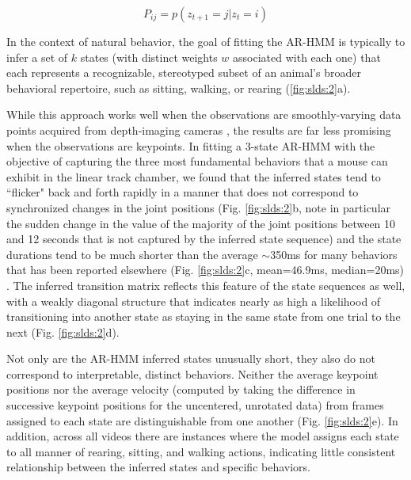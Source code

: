 \begin{equation}
\label{eq:slds_2}
    P_{ij} = p\left( {z_{t + 1} = j|z_t = i} \right)
\end{equation}

In the context of natural behavior, the goal of fitting the AR-HMM is typically to infer a set of $k$ states (with distinct weights $w$ associated with each one) that each represents a recognizable, stereotyped subset of an animal's broader behavioral repertoire, such as sitting, walking, or rearing (\ref{fig:slds:2}a).

While this approach works well when the observations are smoothly-varying data points acquired from depth-imaging cameras \cite{wiltschko_mapping_2015, markowitz_striatum_2018, wiltschko_revealing_2020}, the results are far less promising when the observations are keypoints. In fitting a 3-state AR-HMM with the objective of capturing the three most fundamental behaviors that a mouse can exhibit in the linear track chamber, we found that the inferred states tend to ``flicker" back and forth rapidly in a manner that does not correspond to synchronized changes in the joint positions (Fig. \ref{fig:slds:2}b, note in particular the sudden change in the value of the majority of the joint positions between 10 and 12 seconds that is not captured by the inferred state sequence) and the state durations tend to be much shorter than the average $\sim$350ms for many behaviors that has been reported elsewhere (Fig. \ref{fig:slds:2}c, mean=46.9ms, median=20ms) \cite{wiltschko_mapping_2015}. The inferred transition matrix reflects this feature of the state sequences as well, with a weakly diagonal structure that indicates nearly as high a likelihood of transitioning into another state as staying in the same state from one trial to the next (Fig. \ref{fig:slds:2}d). 

Not only are the AR-HMM inferred states unusually short, they also do not correspond to interpretable, distinct behaviors. Neither the average keypoint positions nor the average velocity (computed by taking the difference in successive keypoint positions for the uncentered, unrotated data) from frames assigned to each state are distinguishable from one another (Fig. \ref{fig:slds:2}e). In addition, across all videos there are instances where the model assigns each state to all manner of rearing, sitting, and walking actions, indicating little consistent relationship between the inferred states and specific behaviors. 
